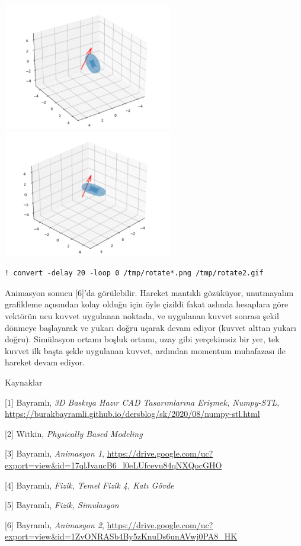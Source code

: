 \documentclass[12pt,fleqn]{article}\usepackage{../../common}
\begin{document}
\includegraphics[width=20em]{sim2/rotate_12.png}
\includegraphics[width=20em]{sim2/rotate_18.png}


\begin{verbatim}
! convert -delay 20 -loop 0 /tmp/rotate*.png /tmp/rotate2.gif
\end{verbatim}

Animasyon sonucu [6]'da görülebilir. Hareket mantıklı gözüküyor, unutmayalım
grafikleme açısından kolay olduğu için öyle çizildi fakat aslında hesaplara göre
vektörün ucu kuvvet uygulanan noktada, ve uygulanan kuvvet sonrası şekil dönmeye
başlayarak ve yukarı doğru uçarak devam ediyor (kuvvet alttan yukarı doğru).
Simülasyon ortamı boşluk ortamı, uzay gibi yerçekimsiz bir yer, tek kuvvet ilk
başta şekle uygulanan kuvvet, ardından momentum muhafazası ile hareket devam
ediyor.

Kaynaklar

[1] Bayramlı, {\em 3D Baskıya Hazır CAD Tasarımlarına Erişmek, Numpy-STL},
    \url{https://burakbayramli.github.io/dersblog/sk/2020/08/numpy-stl.html}

[2] Witkin, {\em Physically Based Modeling}

[3] Bayramlı, {\em Animasyon 1},
    \url{https://drive.google.com/uc?export=view&id=17qlJvaucB6_l0eLUfcevu84qNXQocGHO}

[4] Bayramlı, {\em Fizik, Temel Fizik 4, Katı Gövde}

[5] Bayramlı, {\em Fizik, Simulasyon}

[6] Bayramlı, {\em Animasyon 2},
    \url{https://drive.google.com/uc?export=view&id=1ZvONRASb4By5zKnuDs6unAVwj0PA8_HK}
\end{document}
